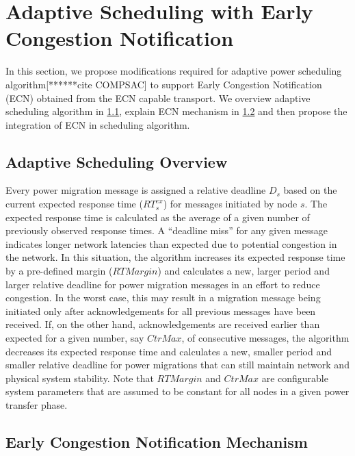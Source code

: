 \section{Adaptive Scheduling with Early Congestion Notification}
\label{sec:adaptive_with_ecn}

In this section, we propose modifications required for adaptive power scheduling algorithm[******cite COMPSAC] to support Early Congestion Notification (ECN) obtained from the ECN capable transport. We overview adaptive scheduling algorithm in \ref{sec:adaptive_sched_overview}, explain ECN mechanism in \ref{sec:explain_ecn} and then propose the integration of ECN in scheduling algorithm.

\subsection{Adaptive Scheduling Overview}
\label{sec:adaptive_sched_overview} 

Every power migration message
is assigned a relative deadline $D_s$ based on the current expected response
time ($RT_s^{ex}$) for messages initiated by node $s$. The expected response
time is calculated as the average of a given number of previously observed
response times. A ``deadline miss'' for any given message indicates longer
network latencies than expected due to potential congestion in the network. In
this situation, the algorithm increases its expected response time by a
pre-defined margin ($RTMargin$) and calculates a new, larger period and larger
relative deadline for power migration messages in an effort to reduce
congestion. In the worst case, this may result in a migration message being
initiated only after acknowledgements for all previous messages have been
received. If, on the other hand, acknowledgements are received earlier than expected
for a given number, say $CtrMax$, of consecutive messages, the algorithm 
decreases its expected response time and calculates a new, smaller period and smaller 
relative deadline for power migrations that can still maintain network and physical 
system stability. Note that $RTMargin$ and $CtrMax$ are configurable system parameters 
that are assumed to be constant for all nodes in a given power transfer phase. 

\subsection{Early Congestion Notification Mechanism}
\label{sec:explain_ecn} 

